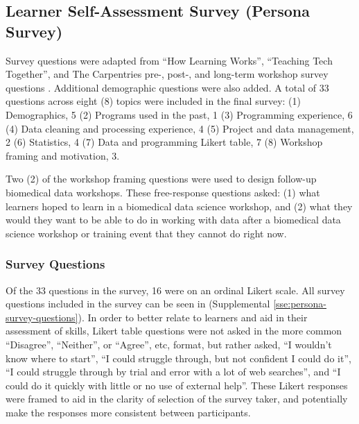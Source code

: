\documentclass[020-persona\_validation.tex]{subfiles}
\begin{document}
    \subsection{Learner Self-Assessment Survey (Persona Survey)}

        Survey questions were adapted from
        ``How Learning Works'',
        ``Teaching Tech Together'', and
        The Carpentries pre-, post-, and long-term workshop survey questions
        \cite{ambrose2010learning, wilson2019teaching, jordanAnalysisSoftwareData2018, jordanAnalysisCarpentriesLongTerm2020, jordanAnalysisCarpentriesLongTerm2018, jordanAnalysisCarpentriesLongTerm2017}.
        Additional demographic questions were also added.
        A total of 33 questions across eight (8) topics were included in the final survey:
        (1) Demographics, 5
        (2) Programs used in the past, 1
        (3) Programming experience, 6
        (4) Data cleaning and processing experience, 4
        (5) Project and data management, 2
        (6) Statistics, 4
        (7) Data and programming Likert table, 7
        (8) Workshop framing and motivation, 3.

        Two (2) of the workshop framing questions were used to design follow-up biomedical data workshops.
        These free-response questions asked:
        (1) what learners hoped to learn in a biomedical data science workshop, and
        (2) what they would they want to be able to do in working with data after a biomedical data science workshop
            or training event that they cannot do right now.

        \subsubsection{Survey Questions}

            Of the 33 questions in the survey, 16 were on an ordinal Likert scale.
            All survey questions included in the survey can be seen in
            (Supplemental \ref{sse:persona-survey-questions}).
            In order to better relate to learners and aid in their assessment of skills,
            Likert table questions were not asked in the more common
            ``Disagree'', ``Neither'', or ``Agree'', etc,
            format,
            but rather asked,
            ``I wouldn't know where to start'',
            ``I could struggle through, but not confident I could do it'',
            ``I could struggle through by trial and error with a lot of web searches'',
            and
            ``I could do it quickly with little or no use of external help''.
            These Likert responses were framed to aid in the clarity of selection of the survey taker,
            and potentially make the responses more consistent between participants.
\end{document}
